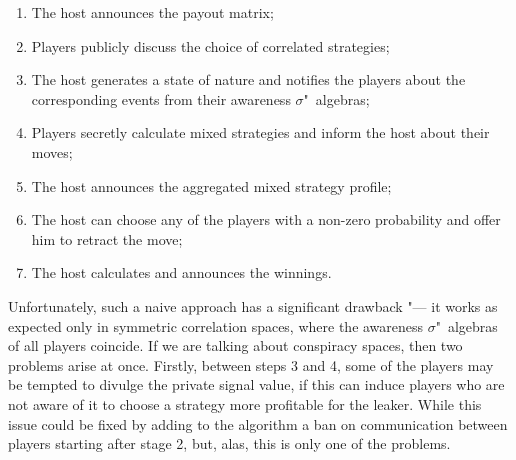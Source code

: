 \begin{enumerate}
	\item The host announces the payout matrix; %
	\item Players publicly discuss the choice of correlated strategies; %
	\item The host generates a state of nature and notifies the players about the corresponding events from their awareness $\sigma$"~algebras; %
	\item Players secretly calculate mixed strategies and inform the host about their moves; %
	\item The host announces the aggregated mixed strategy profile; %
	\item The host can choose any of the players with a non-zero probability and offer him to retract the move; %
	\item The host calculates and announces the winnings. %
\end{enumerate}

Unfortunately, such a naive approach has a significant drawback "--- it works as expected only in symmetric correlation spaces, where the awareness $\sigma$"~algebras of all players coincide. If we are talking about conspiracy spaces, then two problems arise at once. Firstly, between steps 3 and 4, some of the players may be tempted to divulge the private signal value, if this can induce players who are not aware of it to choose a strategy more profitable for the leaker. While this issue could be fixed by adding to the algorithm a ban on communication between players starting after stage 2, but, alas, this is only one of the problems. %

